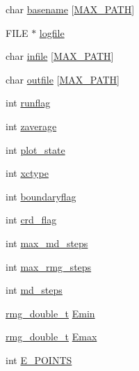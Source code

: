 \begin{DoxyCompactItemize}
char \hyperlink{struct_c_o_n_t_r_o_l_a706f1d5c4d7a33d43f8340bd581214f9}{basename} \mbox{[}\hyperlink{_t_d_d_f_t_2_headers_2params_8h_ab99ded389af74001a6298fc9e44e74e5}{M\-A\-X\-\_\-\-P\-A\-T\-H}\mbox{]}
\item 
F\-I\-L\-E $\ast$ \hyperlink{struct_c_o_n_t_r_o_l_a743c05f31c25b3ee10c2f9ea5ae1f0a5}{logfile}
\item 
char \hyperlink{struct_c_o_n_t_r_o_l_a10b0ee0d0445c2344f578869f79fbea8}{infile} \mbox{[}\hyperlink{_t_d_d_f_t_2_headers_2params_8h_ab99ded389af74001a6298fc9e44e74e5}{M\-A\-X\-\_\-\-P\-A\-T\-H}\mbox{]}
\item 
char \hyperlink{struct_c_o_n_t_r_o_l_ac5cf2f43d66f134f9ceeecc49e0f83c8}{outfile} \mbox{[}\hyperlink{_t_d_d_f_t_2_headers_2params_8h_ab99ded389af74001a6298fc9e44e74e5}{M\-A\-X\-\_\-\-P\-A\-T\-H}\mbox{]}
\item 
int \hyperlink{struct_c_o_n_t_r_o_l_af9d366617e951c66f897c61ec028b3ab}{runflag}
\item 
int \hyperlink{struct_c_o_n_t_r_o_l_af04f14a0d1e07615519e4af7921b4e6e}{zaverage}
\item 
int \hyperlink{struct_c_o_n_t_r_o_l_ad7ef7851ea1a49b8380c889e0e714349}{plot\-\_\-state}
\item 
int \hyperlink{struct_c_o_n_t_r_o_l_a970c9c018326f9794de330cf0015b641}{xctype}
\item 
int \hyperlink{struct_c_o_n_t_r_o_l_a3176bb702e3786949f5dfc3959446752}{boundaryflag}
\item 
int \hyperlink{struct_c_o_n_t_r_o_l_a5f30dd6c690cb01a95abaa617d734d36}{crd\-\_\-flag}
\item 
int \hyperlink{struct_c_o_n_t_r_o_l_a155eb214f3cae8c0309868238d3b981f}{max\-\_\-md\-\_\-steps}
\item 
int \hyperlink{struct_c_o_n_t_r_o_l_aad953726c84070fe21789ee3565ad575}{max\-\_\-rmg\-\_\-steps}
\item 
int \hyperlink{struct_c_o_n_t_r_o_l_a4b213b9e67882c66795d16886f977b44}{md\-\_\-steps}
\item 
\hyperlink{rmgtypes_8h_aaa16921c14f121c56eaa42390a340db8}{rmg\-\_\-double\-\_\-t} \hyperlink{struct_c_o_n_t_r_o_l_afe3534f39ac93d62bd3bfaff3b2ceade}{Emin}
\item 
\hyperlink{rmgtypes_8h_aaa16921c14f121c56eaa42390a340db8}{rmg\-\_\-double\-\_\-t} \hyperlink{struct_c_o_n_t_r_o_l_a4afb9bbd5300997eceaee602e9fc1bf8}{Emax}
\item 
int \hyperlink{struct_c_o_n_t_r_o_l_a37becde3eb79d287a97ac724d170d0d3}{E\-\_\-\-P\-O\-I\-N\-T\-S}
\item 

\end{DoxyCompactItemize}
